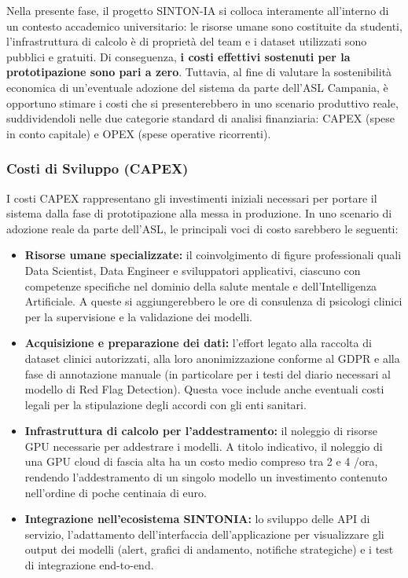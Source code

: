 Nella presente fase, il progetto SINTON-IA si colloca interamente all'interno di un contesto accademico universitario: le risorse umane sono costituite da studenti, l'infrastruttura di calcolo è di proprietà del team e i dataset utilizzati sono pubblici e gratuiti. Di conseguenza, \textbf{i costi effettivi sostenuti per la prototipazione sono pari a zero}. Tuttavia, al fine di valutare la sostenibilità economica di un'eventuale adozione del sistema da parte dell'ASL Campania, è opportuno stimare i costi che si presenterebbero in uno scenario produttivo reale, suddividendoli nelle due categorie standard di analisi finanziaria: CAPEX (spese in conto capitale) e OPEX (spese operative ricorrenti).

\subsubsection{Costi di Sviluppo (CAPEX)}
\label{subsubsec:capex}

I costi CAPEX rappresentano gli investimenti iniziali necessari per portare il sistema dalla fase di prototipazione alla messa in produzione. In uno scenario di adozione reale da parte dell'ASL, le principali voci di costo sarebbero le seguenti:

\begin{itemize}
    \item \textbf{Risorse umane specializzate:} il coinvolgimento di figure professionali quali Data Scientist, Data Engineer e sviluppatori applicativi, ciascuno con competenze specifiche nel dominio della salute mentale e dell'Intelligenza Artificiale. A queste si aggiungerebbero le ore di consulenza di psicologi clinici per la supervisione e la validazione dei modelli.

    \item \textbf{Acquisizione e preparazione dei dati:} l'effort legato alla raccolta di dataset clinici autorizzati, alla loro anonimizzazione conforme al GDPR e alla fase di annotazione manuale (in particolare per i testi del diario necessari al modello di Red Flag Detection). Questa voce include anche eventuali costi legali per la stipulazione degli accordi con gli enti sanitari.

    \item \textbf{Infrastruttura di calcolo per l'addestramento:} il noleggio di risorse GPU necessarie per addestrare i modelli. A titolo indicativo, il noleggio di una GPU cloud di fascia alta ha un costo medio compreso tra 2 e 4 \texteuro/ora, rendendo l'addestramento di un singolo modello un investimento contenuto nell'ordine di poche centinaia di euro.

    \item \textbf{Integrazione nell'ecosistema SINTONIA:} lo sviluppo delle API di servizio, l'adattamento dell'interfaccia dell'applicazione per visualizzare gli output dei modelli (alert, grafici di andamento, notifiche strategiche) e i test di integrazione end-to-end.
\end{itemize}

